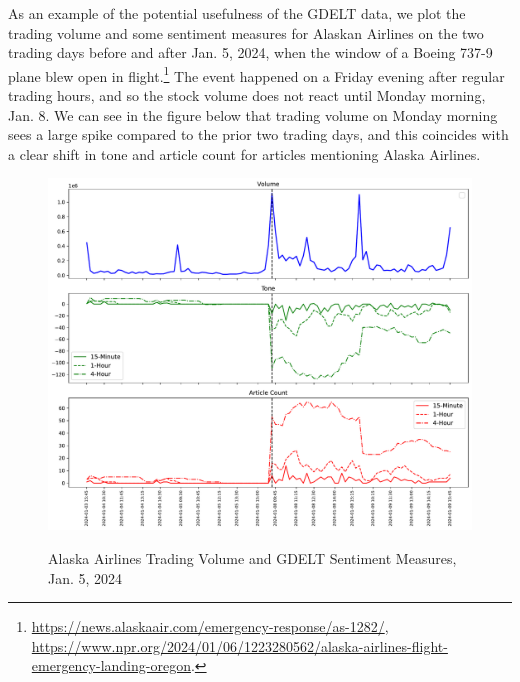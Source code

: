 \documentclass[12pt]{article}
\begin{document}
As an example of the potential usefulness of the GDELT data, we plot the trading volume and some sentiment measures for Alaskan Airlines on the two trading days before and after Jan. 5, 2024, when the window of a Boeing 737-9 plane blew open in flight.\footnote{\url{https://news.alaskaair.com/emergency-response/as-1282/}, \url{https://www.npr.org/2024/01/06/1223280562/alaska-airlines-flight-emergency-landing-oregon}.} The event happened on a Friday evening after regular trading hours, and so the stock volume does not react until Monday morning, Jan. 8. We can see in the figure below that trading volume on Monday morning sees a large spike compared to the prior two trading days, and this coincides with a clear shift in tone and article count for articles mentioning Alaska Airlines.
\begin{figure}[H]
    \centering
    \caption{Alaska Airlines Trading Volume and GDELT Sentiment Measures, Jan. 5, 2024}
    \includegraphics[width=0.9\linewidth]{../Output/alk_event_plot_52.pdf}
    \label{fig:alaska_volume_sentiment}
\end{figure}
\end{document}
